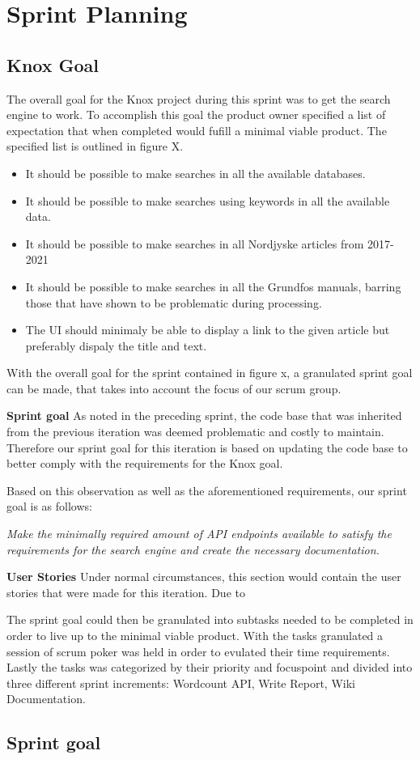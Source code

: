 \section{Sprint Planning}
\subsection{Knox Goal}
The overall goal for the Knox project during this sprint was to get the search engine to work. To accomplish this goal the product owner specified a list of expectation that when completed would fufill a minimal viable product. The specified list is outlined in figure X.
\begin{itemize}
	\item It should be possible to make searches in all the available databases.
	\item It should be possible to make searches using keywords in all the available data.
	\item It should be possible to make searches in all Nordjyske articles from 2017-2021
	\item It should be possible to make searches in all the Grundfos manuals, barring those that have shown to be problematic during processing.
	\item The UI should minimaly be able to display a link to the given article but preferably dispaly the title and text.
\end{itemize}

With the overall goal for the sprint contained in figure x, a granulated sprint goal can be made, that takes into account the focus of our scrum group.

\textbf{Sprint goal}
As noted in the preceding sprint, the code base that was inherited from the previous iteration was deemed problematic and costly to maintain. Therefore our sprint goal for this iteration is based on updating the code base to better comply with the requirements for the Knox goal.

Based on this observation as well as the aforementioned requirements, our sprint goal is as follows:

\textit{Make the minimally required amount of API endpoints available to satisfy the requirements for the search engine and create the necessary documentation.}

\textbf{User Stories}
Under normal circumstances, this section would contain the user stories that were made for this iteration. Due to  


The sprint goal could then be granulated into subtasks needed to be completed in order to live up to the minimal viable product. With the tasks granulated a session of scrum poker was held in order to evulated their time requirements. Lastly the tasks was categorized by their priority and focuspoint and divided into three different sprint increments: Wordcount API, Write Report, Wiki Documentation. 






\subsection{Sprint goal}
